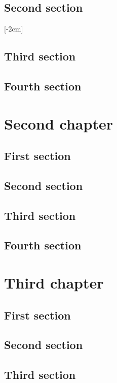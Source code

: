 \documentclass{researchbook}
\begin{document}
\section{Second section}\lipsum
\reversemarginpar{}[-2cm]
\section{Third section}\lipsum
\section{Fourth section}\lipsum

\chapter{Second chapter}

\section{First section}\lipsum
\section{Second section}\lipsum
\section{Third section}\lipsum
\section{Fourth section}\lipsum


\chapter{Third chapter}

\section{First section}\lipsum
\section{Second section}\lipsum
\section{Third section}\lipsum
\end{document}
